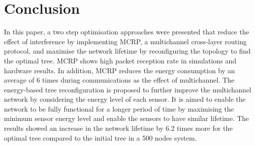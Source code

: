 \section{Conclusion}
\label{Conclusion}

In this paper, a two step optimisation approaches were presented that reduce the effect of interference by implementing MCRP, a multichannel cross-layer routing protocol, and maximise the network lifetime by reconfiguring the topology to find the optimal tree. 
MCRP shows high packet reception rate in simulations and hardware results. In addition, MCRP reduces the energy consumption by an average of 6 times during communications as the effect of multichannel.
The energy-based tree reconfiguration is proposed to further improve the multichannel network by considering the energy level of each sensor. 
It is aimed to enable the network to be fully functional for a longer period of time by maximising the minimum sensor energy level and enable the sensors to have similar lifetime.
The results showed an increase in the network lifetime by 6.2 times more for the optimal tree compared to the initial tree in a 500 nodes system.